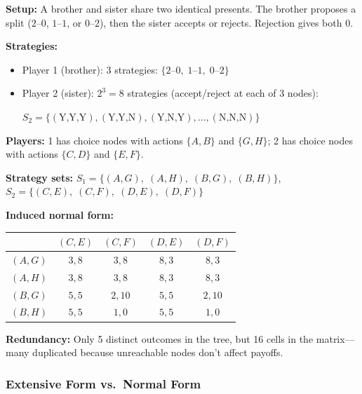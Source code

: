 \begin{exbox}
\textbf{Setup:} A brother and sister share two identical presents. The brother proposes a split ($2$--$0$, $1$--$1$, or $0$--$2$), then the sister accepts or rejects. Rejection gives both $0$.

\textbf{Strategies:}
\begin{itemize}
  \item Player 1 (brother): 3 strategies: $\{2\text{--}0,\; 1\text{--}1,\; 0\text{--}2\}$
  \item Player 2 (sister): $2^3 = 8$ strategies (accept/reject at each of 3 nodes):

  $S_2 = \{(\text{Y,Y,Y}), (\text{Y,Y,N}), (\text{Y,N,Y}), \ldots, (\text{N,N,N})\}$
\end{itemize}
\end{exbox}

\begin{exbox}
\textbf{Players:} 1 has choice nodes with actions $\{A,B\}$ and $\{G,H\}$; 2 has choice nodes with actions $\{C,D\}$ and $\{E,F\}$.

\textbf{Strategy sets:}
$S_1 = \{(A,G),\; (A,H),\; (B,G),\; (B,H)\}$, \quad $S_2 = \{(C,E),\; (C,F),\; (D,E),\; (D,F)\}$

\textbf{Induced normal form:}
\begin{center}
\renewcommand{\arraystretch}{1.3}
\begin{tabular}{@{} c | c c c c @{}}
 & $(C,E)$ & $(C,F)$ & $(D,E)$ & $(D,F)$ \\
\midrule
$(A,G)$ & $3,8$ & $3,8$ & $8,3$ & $8,3$ \\
$(A,H)$ & $3,8$ & $3,8$ & $8,3$ & $8,3$ \\
$(B,G)$ & $5,5$ & $2,10$ & $5,5$ & $2,10$ \\
$(B,H)$ & $5,5$ & $1,0$ & $5,5$ & $1,0$ \\
\end{tabular}
\end{center}

\textbf{Redundancy:} Only 5 distinct outcomes in the tree, but 16 cells in the matrix---many duplicated because unreachable nodes don't affect payoffs.
\end{exbox}

\separator

\subsubsection{Extensive Form vs.\ Normal Form}

